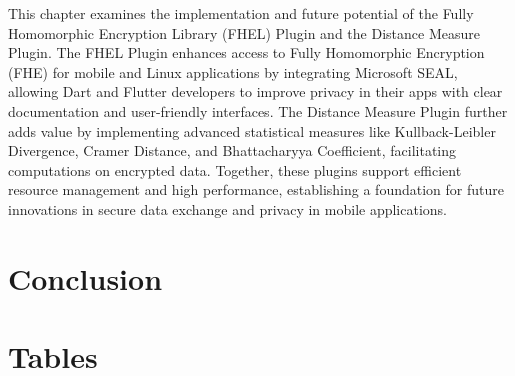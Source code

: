 \documentclass [11pt, proquest] {uwthesis}[2020/02/24]
\begin{document}
This chapter examines the implementation and future potential of the Fully Homomorphic Encryption Library (FHEL) Plugin and the Distance Measure Plugin. The FHEL Plugin enhances access to Fully Homomorphic Encryption (FHE) for mobile and Linux applications by integrating Microsoft SEAL, allowing Dart and Flutter developers to improve privacy in their apps with clear documentation and user-friendly interfaces. The Distance Measure Plugin further adds value by implementing advanced statistical measures like Kullback-Leibler Divergence, Cramer Distance, and Bhattacharyya Coefficient, facilitating computations on encrypted data. Together, these plugins support efficient resource management and high performance, establishing a foundation for future innovations in secure data exchange and privacy in mobile applications.






\chapter{Conclusion}


%
%
\nocite{*}   %


%
%
\appendix
\raggedbottom\sloppy
 
 
\chapter{Tables}
 


\end{document}
